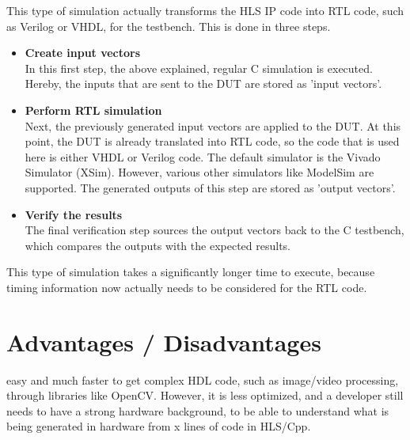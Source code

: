 This type of simulation actually transforms the HLS IP code into RTL code, such as Verilog or VHDL, for the testbench.
This is done in three steps.\\

\begin{itemize}
  \item \textbf{Create input vectors}\\
  In this first step, the above explained, regular C simulation is executed.
  Hereby, the inputs that are sent to the DUT are stored as 'input vectors'.

  \item \textbf{Perform RTL simulation}\\
  Next, the previously generated input vectors are applied to the DUT.
  At this point, the DUT is already translated into RTL code, so the code that is used here is either VHDL or Verilog code.
  The default simulator is the Vivado Simulator (XSim).
  However, various other simulators like ModelSim are supported.
  The generated outputs of this step are stored as 'output vectors'.
  \item \textbf{Verify the results}\\
  The final verification step sources the output vectors back to the C testbench, which compares the outputs with the expected results.\\
\end{itemize}

\noindent
This type of simulation takes a significantly longer time to execute, because timing information now actually needs to be considered for the RTL code.

\section{Advantages / Disadvantages}
easy and much faster to get complex HDL code, such as image/video processing, through libraries like OpenCV. However, it is less optimized, and a developer still needs to have a strong hardware background, to be able to understand what is being generated in hardware from x lines of code in HLS/Cpp.
